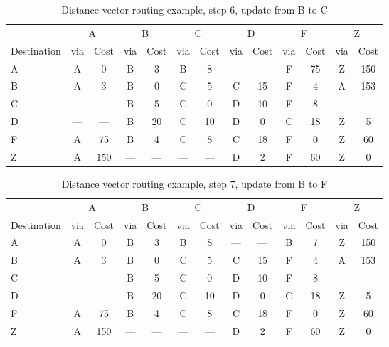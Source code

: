 \begin{table}
    \caption{Distance vector  routing example, step 6, update from B to C }
    \label{tab:dv:step:6}
\begin{tabular}{l|c|c|c|c|c|c|c|c|c|c|c|c}
    \toprule
      & \multicolumn{2}{c|}{A}&\multicolumn{2}{c|}{B}&\multicolumn{2}{c|}{C}&\multicolumn{2}{c|}{D}&\multicolumn{2}{c|}{F}&\multicolumn{2}{c|}{Z} \\
    Destination & via&Cost&via&Cost&via&Cost&via&Cost&via&Cost&via&Cost \\ 
    \midrule
    A & A & 0 &B & 3 &B & 8 &--- & ---&F & 75 &Z & 150 
 \\B & A & 3 &B & 0 &C & 5 &C & 15 &F & 4 &A & 153 
 \\C & --- & ---&B & 5 &C & 0 &D & 10 &F & 8 &--- & ---
 \\D & --- & ---&B & 20 &C & 10 &D & 0 &C & 18 &Z & 5 
 \\F & A & 75 &B & 4 &C & 8 &C & 18 &F & 0 &Z & 60 
 \\Z & A & 150 &--- & ---&--- & ---&D & 2 &F & 60 &Z & 0 
    \\ \bottomrule 
\end{tabular}
\end{table}
    

\begin{table}
    \caption{Distance vector  routing example, step 7, update from B to F }
    \label{tab:dv:step:7}
\begin{tabular}{l|c|c|c|c|c|c|c|c|c|c|c|c}
    \toprule
      & \multicolumn{2}{c|}{A}&\multicolumn{2}{c|}{B}&\multicolumn{2}{c|}{C}&\multicolumn{2}{c|}{D}&\multicolumn{2}{c|}{F}&\multicolumn{2}{c|}{Z} \\
    Destination & via&Cost&via&Cost&via&Cost&via&Cost&via&Cost&via&Cost \\ 
    \midrule
    A & A & 0 &B & 3 &B & 8 &--- & ---&B & 7 &Z & 150 
 \\B & A & 3 &B & 0 &C & 5 &C & 15 &F & 4 &A & 153 
 \\C & --- & ---&B & 5 &C & 0 &D & 10 &F & 8 &--- & ---
 \\D & --- & ---&B & 20 &C & 10 &D & 0 &C & 18 &Z & 5 
 \\F & A & 75 &B & 4 &C & 8 &C & 18 &F & 0 &Z & 60 
 \\Z & A & 150 &--- & ---&--- & ---&D & 2 &F & 60 &Z & 0 
    \\ \bottomrule 
\end{tabular}
\end{table}
    

